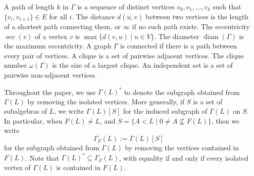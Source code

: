 \documentclass[11pt]{amsart}
\theoremstyle{plain}
\begin{document}
A path of length $k$ in $\Gamma$ is a sequence of distinct vertices $v_0, v_1,\ldots, v_k$ such that $\{v_i, v_{i+1}\} \in E$ for all $i$. The distance $d(u, v)$ between two vertices is the length of a shortest path connecting them, or $\infty$ if no such path exists. The eccentricity $\operatorname{ecc}(v)$ of a vertex $v$ is $\max\{d(v, u)\mid u\in V\}$. The diameter $\operatorname{diam}(\Gamma)$ is the maximum eccentricity. %
A graph $\Gamma$ is connected if there is a path between every pair of vertices. %
A clique is a set of pairwise adjacent vertices. The clique number $\omega(\Gamma)$ is the size of a largest clique. An independent set is a set of pairwise non-adjacent vertices. 


Throughout the paper, we use $\Gamma(L)^*$ to denote the subgraph obtained
from $\Gamma(L)$ by removing the isolated vertices. More generally, if $S$
is a set of subalgebras of $L$, we write $\Gamma(L)[S]$ for the induced
subgraph of $\Gamma(L)$ on $S$. In particular, when $F(L) \neq L$, and $S=\{A < L\mid 0\neq A \not\subseteq F(L)\}$, then we write
\[\Gamma_F(L) := \Gamma(L)[S]\]
for the subgraph obtained from $\Gamma(L)$ by removing the vertices contained
in $F(L)$. Note that $\Gamma(L)^* \subseteq \Gamma_F(L)$, with equality if
and only if every isolated vertex of $\Gamma(L)$ is contained in $F(L)$.
\end{document}
